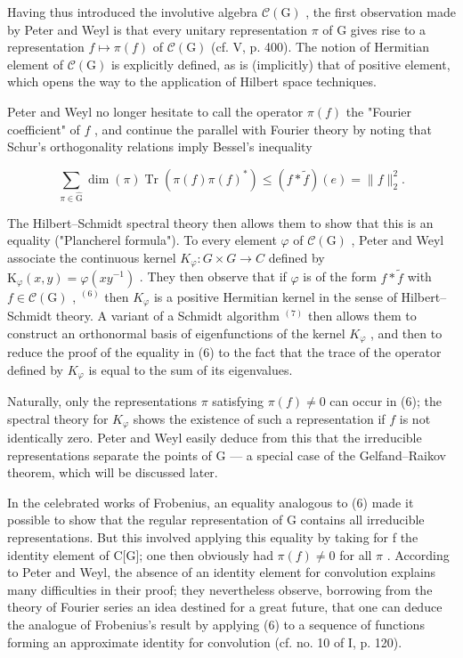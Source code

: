 Having thus introduced the involutive algebra \(\mathcal{C}(\mathrm{G})\) , the first observation made by Peter and Weyl is that every unitary representation \(\pi\) of G gives rise to a representation \(f \mapsto \pi(f)\) of \(\mathcal{C}(\mathrm{G})\) (cf. V, p. 400). The notion of Hermitian element of \(\mathcal{C}(\mathrm{G})\) is explicitly defined, as is (implicitly) that of positive element, which opens the way to the application of Hilbert space techniques.

Peter and Weyl no longer hesitate to call the operator \(\pi(f)\) the "Fourier coefficient" of \(f\) , and continue the parallel with Fourier theory by noting that Schur's orthogonality relations imply Bessel's inequality

\[
\sum_ {\pi \in \widehat {\mathrm{G}}} \dim (\pi) \operatorname{Tr} (\pi (f) \pi (f) ^ {*}) \leqslant (f * \widetilde {f}) (e) = \| f \| _ {2} ^ {2}.\tag{6}
\]

The Hilbert--Schmidt spectral theory then allows them to show that this is an equality ("Plancherel formula"). To every element \(\varphi\) of \(\mathcal{C}(\mathrm{G})\) , Peter and Weyl associate the continuous kernel \(K_{\varphi}\colon G\times G\to C\) defined by \(\mathrm{K}_{\varphi}(x,y)=\varphi(xy^{-1})\) . They then observe that if \(\varphi\) is of the form \(f*\widetilde{f}\) with \(f\in\mathcal{C}(\mathrm{G})\) , \(^{(6)}\) then \(K_{\varphi}\) is a positive Hermitian kernel in the sense of Hilbert--Schmidt theory. A variant of a Schmidt algorithm \(^{(7)}\) then allows them to construct an orthonormal basis of eigenfunctions of the kernel \(K_{\varphi}\) , and then to reduce the proof of the equality in (6) to the fact that the trace of the operator defined by \(K_{\varphi}\) is equal to the sum of its eigenvalues.

Naturally, only the representations \(\pi\) satisfying \(\pi(f) \neq 0\) can occur in (6); the spectral theory for \(K_{\varphi}\) shows the existence of such a representation if \(f\) is not identically zero. Peter and Weyl easily deduce from this that the irreducible representations separate the points of G --- a special case of the Gelfand--Raikov theorem, which will be discussed later.

In the celebrated works of Frobenius, an equality analogous to (6) made it possible to show that the regular representation of G contains all irreducible representations. But this involved applying this equality by taking for f the identity element of C{[}G{]}; one then obviously had \(\pi(f) \neq 0\) for all \(\pi\) . According to Peter and Weyl, the absence of an identity element for convolution explains many difficulties in their proof; they nevertheless observe, borrowing from the theory of Fourier series an idea destined for a great future, that one can deduce the analogue of Frobenius's result by applying (6) to a sequence of functions forming an approximate identity for convolution (cf. no. 10 of I, p. 120).

